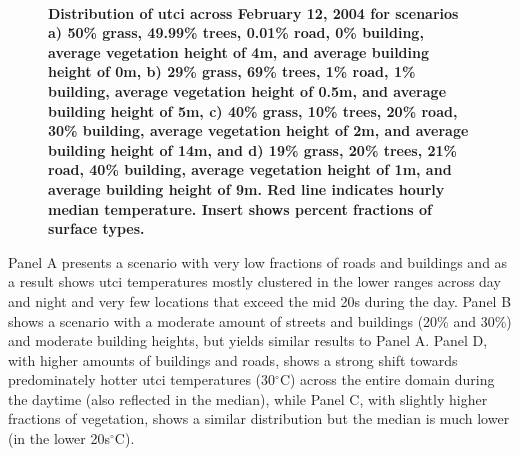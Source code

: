 \documentclass[final,3p,times,authoryear]{elsarticle}
\begin{document}
\begin{figure}
\centering
{}
\\
\caption{\bf Distribution of \gls{utci} across February 12, 2004 for scenarios a) 50\% grass, 49.99\% trees, 0.01\% road, 0\% building, average vegetation height of 4m, and average building height of 0m, b) 29\% grass, 69\% trees, 1\% road, 1\% building, average vegetation height of 0.5m, and average building height of 5m, c) 40\% grass, 10\% trees, 20\% road, 30\% building, average vegetation height of 2m, and average building height of 14m, and d) 19\% grass, 20\% trees, 21\% road, 40\% building, average vegetation height of 1m, and average building height of 9m. Red line indicates hourly median temperature. Insert shows percent fractions of surface types.}
 \label{fig:dist1}
\end{figure}

Panel A presents a scenario with very low fractions of roads and buildings and as a result shows \gls{utci} temperatures mostly clustered in the lower ranges across day and night and very few locations that exceed the mid 20s during the day. Panel B shows a scenario with a moderate amount of streets and buildings (20\% and 30\%) and moderate building heights, but yields similar results to Panel A. Panel D, with higher amounts of buildings and roads, shows a strong shift towards predominately hotter \gls{utci} temperatures (30$^{\circ}$C) across the entire domain during the daytime (also reflected in the median), while Panel C, with slightly higher fractions of vegetation, shows a similar distribution but the median is much lower (in the lower 20s$^{\circ}$C).



 
\end{document}
